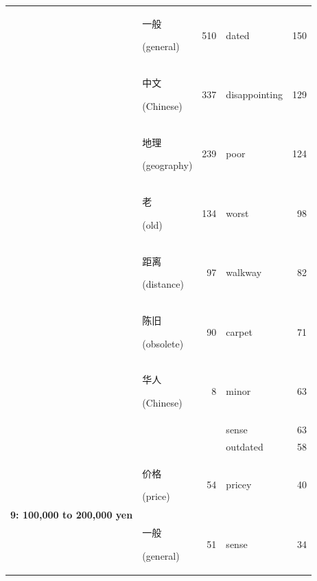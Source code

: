 \documentclass[smallextended,natbib]{svjour3}       %
\begin{document}
\begin{table}[ht]
{\begin{tabular}{|c|lr|lr|}
                                                             & \begin{CJK}{UTF8}{gbsn}一般\end{CJK} (general)   & 510  & dated          & 150 \\  
                                                             & \begin{CJK}{UTF8}{gbsn}中文\end{CJK} (Chinese)   & 337  & disappointing  & 129 \\  
                                                             & \begin{CJK}{UTF8}{gbsn}地理\end{CJK} (geography) & 239  & poor           & 124 \\  
                                                             & \begin{CJK}{UTF8}{gbsn}老\end{CJK} (old)        & 134  & worst          & 98  \\  
                                                             & \begin{CJK}{UTF8}{gbsn}距离\end{CJK} (distance)  & 97   & walkway        & 82  \\  
                                                             & \begin{CJK}{UTF8}{gbsn}陈旧\end{CJK} (obsolete)  & 90   & carpet         & 71  \\  
                                                             & \begin{CJK}{UTF8}{gbsn}华人\end{CJK} (Chinese)   & 8    & minor          & 63  \\  
                                                             &                                                &      & sense          & 63  \\  
                                                             &                                                &      & outdated       & 58  \\ \hline
        \multirow{10}{*}{\textbf{9: 100,000 to 200,000 yen}} & \begin{CJK}{UTF8}{gbsn}价格\end{CJK} (price)     & 54   & pricey         & 40  \\  
                                                             & \begin{CJK}{UTF8}{gbsn}一般\end{CJK} (general)   & 51   & sense          & 34  \\  

\end{tabular}}
\end{table}
\end{document}
